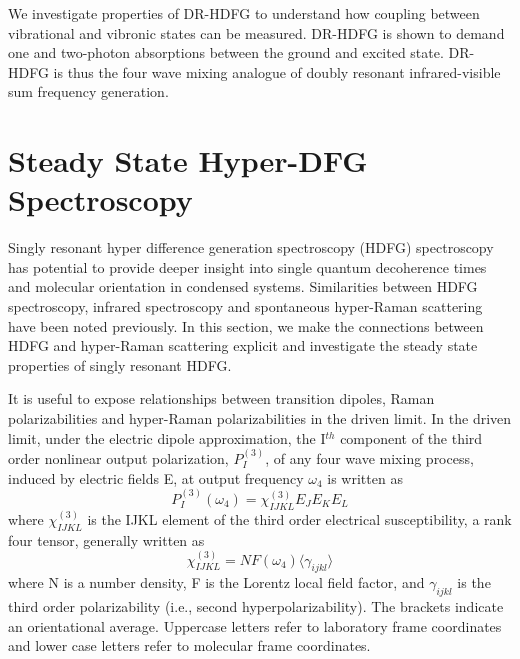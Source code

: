 \documentclass[aip, jcp, reprint, onecolumn]{revtex4-2}
\begin{document}
We investigate properties of DR-HDFG to understand how coupling between vibrational and vibronic states can be measured.
DR-HDFG is shown to demand one and two-photon absorptions between the ground and excited state.
DR-HDFG is thus the four wave mixing analogue of doubly resonant infrared-visible sum frequency generation. \cite{Shen94}

\section{Steady State Hyper-DFG Spectroscopy}
Singly resonant hyper difference generation spectroscopy (HDFG) spectroscopy has potential to provide deeper insight into single quantum decoherence times and molecular orientation in condensed systems.
Similarities between HDFG spectroscopy, infrared spectroscopy and spontaneous hyper-Raman scattering have been noted previously. \cite{RN352, Bonn2024}
In this section, we make the connections between HDFG and hyper-Raman scattering explicit and investigate the steady state properties of singly resonant HDFG.

It is useful to expose relationships between transition dipoles, Raman polarizabilities and hyper-Raman polarizabilities in the driven limit. \cite{Simpson2004, RN120}
In the driven limit, under the electric dipole approximation, the I$^{th}$ component of the third order nonlinear output polarization, ${P}^{(3)}_I$, of any four wave mixing process, induced by electric fields E, at output frequency $\omega_4$ is written as \cite{RN307}
\begin{equation} \label{polarization}
{P}^{(3)}_I (\omega_4)  = \chi^{(3)}_{IJKL} E_J E_K E_L 
\end{equation}
where $\chi^{(3)}_{IJKL}$ is the IJKL element of the third order electrical susceptibility, a rank four tensor, generally written as
\begin{equation}
	\chi^{(3)}_{IJKL} = NF(\omega_4) \langle \gamma_{ijkl} \rangle
\end{equation}
where N is a number density, F is the Lorentz local field factor, and $\gamma_{ijkl}$ is the third order polarizability (i.e., second hyperpolarizability). 
The brackets indicate an orientational average. 
Uppercase letters refer to laboratory frame coordinates and lower case letters refer to molecular frame coordinates.
\end{document}
